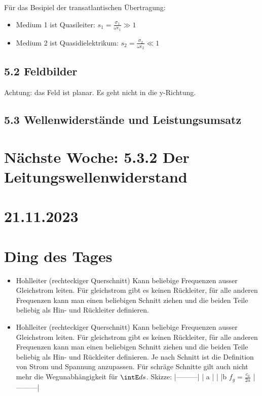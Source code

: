 \documentclass[a4paper]{article}
\begin{document}
Für das Besipiel der transatlantischen Übertragung:
\begin{itemize}
    \item Medium 1 ist Quasileiter: $ s_{1}=\frac{\sigma_{1}}{\omega\epsilon_{1}}\gg1$
    \item Medium 2 ist Quasidielektrikum: $ s_{2}=\frac{\sigma_{2}}{\omega\epsilon_{2}}\ll1$
\end{itemize}

\subsection*{5.2 Feldbilder}
Achtung: das Feld ist planar. Es geht nicht in die y-Richtung.

\subsection*{5.3 Wellenwiderstände und Leistungsumsatz}

\section*{Nächste Woche: 5.3.2 Der Leitungswellenwiderstand}

\section*{21.11.2023}
\section*{Ding des Tages}
\begin{itemize}
    \item Hohlleiter (rechteckiger Querschnitt)
        Kann beliebige Frequenzen ausser Gleichstrom leiten. Für gleichstrom gibt es keinen Rückleiter, für alle anderen Frequenzen kann man einen beliebigen Schnitt ziehen und die beiden Teile beliebig als Hin- und Rückleiter definieren.\item Hohlleiter (rechteckiger Querschnitt)
        Kann beliebige Frequenzen ausser Gleichstrom leiten. Für gleichstrom gibt es keinen Rückleiter, für alle anderen Frequenzen kann man einen beliebigen Schnitt ziehen und die beiden Teile beliebig als Hin- und Rückleiter definieren. Je nach Schnitt ist die Definition von Strom und Spannung anzupassen. Für schräge Schnitte gilt auch nicht mehr die Wegunabhängigkeit für $\intE ds$.
        Skizze:
        |---------|
        | a |
        |   |b $f_{g}=\frac{c_{0}}{2a}$
        |---------|
\end{itemize}
\end{document}

